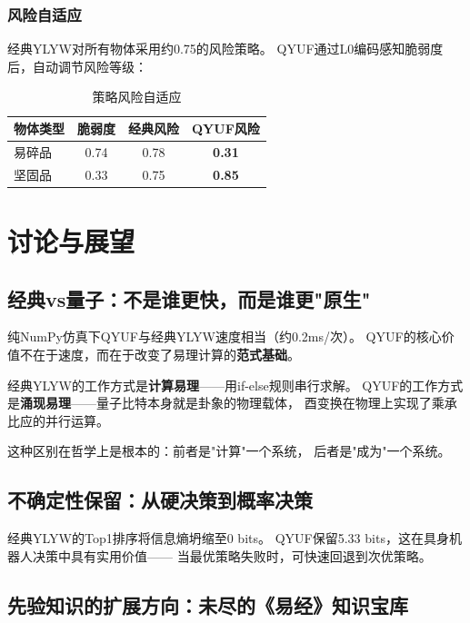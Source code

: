 \documentclass[twocolumn]{article}
\begin{document}
\subsubsection{风险自适应}

经典YLYW对所有物体采用约0.75的风险策略。
QYUF通过L0编码感知脆弱度后，自动调节风险等级：

\begin{table}[htbp]
\centering
\caption{策略风险自适应}
\label{tab:risk}
\begin{tabular}{lccc}
\toprule
\textbf{物体类型} & \textbf{脆弱度} & \textbf{经典风险} & \textbf{QYUF风险} \\
\midrule
易碎品 & 0.74 & 0.78 & \textbf{0.31} \\
坚固品 & 0.33 & 0.75 & \textbf{0.85} \\
\bottomrule
\end{tabular}
\end{table}

\section{讨论与展望}

\subsection{经典vs量子：不是谁更快，而是谁更"原生"}

纯NumPy仿真下QYUF与经典YLYW速度相当（约0.2ms/次）。
QYUF的核心价值不在于速度，而在于改变了易理计算的\textbf{范式基础}。

经典YLYW的工作方式是\textbf{计算易理}——用if-else规则串行求解。
QYUF的工作方式是\textbf{涌现易理}——量子比特本身就是卦象的物理载体，
酉变换在物理上实现了乘承比应的并行运算。

这种区别在哲学上是根本的：前者是"计算"一个系统，
后者是"成为"一个系统。

\subsection{不确定性保留：从硬决策到概率决策}

经典YLYW的Top1排序将信息熵坍缩至0 bits。
QYUF保留5.33 bits，这在具身机器人决策中具有实用价值——
当最优策略失败时，可快速回退到次优策略。

\subsection{先验知识的扩展方向：未尽的《易经》知识宝库}
\end{document}
